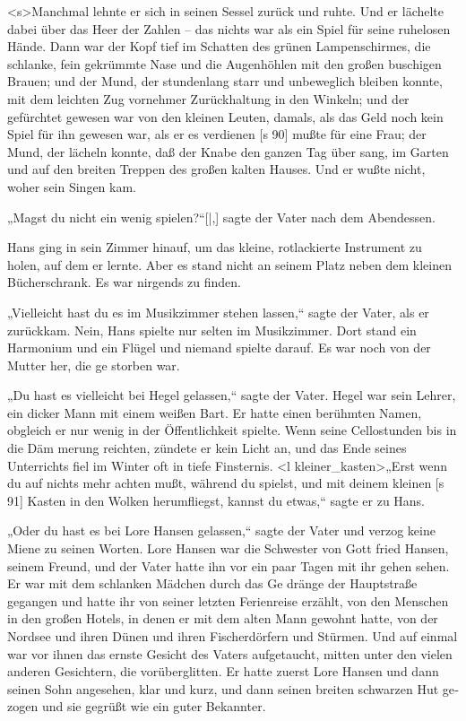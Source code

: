 <s>Manchmal lehnte er sich in seinen Sessel zurück
und ruhte. Und er lächelte dabei über das Heer der
Zahlen – das nichts war als ein Spiel für seine
ruhelosen Hände. Dann war der Kopf tief im Schatten
des grünen Lampenschirmes, die schlanke, fein­
gekrümmte Nase und die Augenhöhlen mit den
großen buschigen Brauen; und der Mund, der
stundenlang starr und unbeweglich bleiben konnte,
mit dem leichten Zug vornehmer Zurückhaltung in
den Winkeln; und der gefürchtet gewesen war von
den kleinen Leuten, damals, als das Geld noch kein
Spiel für ihn gewesen war, als er es verdienen
[s 90]
mußte für eine Frau; der Mund, der lächeln konnte,
daß der Knabe den ganzen Tag über sang, im
Garten und auf den breiten Treppen des großen
kalten Hauses. Und er wußte nicht, woher sein
Singen kam.

„Magst du nicht ein wenig spielen?“[|,] sagte der
Vater nach dem Abendessen.

Hans ging in sein Zimmer hinauf, um das
kleine, rotlackierte Instrument zu holen, auf dem er
lernte. Aber es stand nicht an seinem Platz neben
dem kleinen Bücherschrank. Es war nirgends zu finden.

„Vielleicht hast du es im Musikzimmer stehen
lassen,“ sagte der Vater, als er zurückkam. Nein,
Hans spielte nur selten im Musikzimmer. Dort stand
ein Harmonium und ein Flügel und niemand spielte
darauf. Es war noch von der Mutter her, die ge­
storben war.

„Du hast es vielleicht bei Hegel gelassen,“ sagte
der Vater. Hegel war sein Lehrer, ein dicker Mann
mit einem weißen Bart. Er hatte einen berühmten
Namen, obgleich er nur wenig in der Öffentlichkeit
spielte. Wenn seine Cellostunden bis in die Däm­
merung reichten, zündete er kein Licht an, und das
Ende seines Unterrichts fiel im Winter oft in tiefe
Finsternis. <l kleiner_kasten>„Erst wenn du auf nichts mehr achten
mußt, während du spielst, und mit deinem kleinen
[s 91]
Kasten in den Wolken herumfliegst, kannst du
etwas,“ sagte er zu Hans.

„Oder du hast es bei Lore Hansen gelassen,“
sagte der Vater und verzog keine Miene zu seinen
Worten. Lore Hansen war die Schwester von Gott­
fried Hansen, seinem Freund, und der Vater hatte
ihn vor ein paar Tagen mit ihr gehen sehen. Er
war mit dem schlanken Mädchen durch das Ge­
dränge der Hauptstraße gegangen und hatte ihr von
seiner letzten Ferienreise erzählt, von den Menschen
in den großen Hotels, in denen er mit dem alten
Mann gewohnt hatte, von der Nordsee und ihren
Dünen und ihren Fischerdörfern und Stürmen. Und
auf einmal war vor ihnen das ernste Gesicht des
Vaters aufgetaucht, mitten unter den vielen anderen
Gesichtern, die vorüberglitten. Er hatte zuerst Lore
Hansen und dann seinen Sohn angesehen, klar und
kurz, und dann seinen breiten schwarzen Hut ge­
zogen und sie gegrüßt wie ein guter Bekannter.


